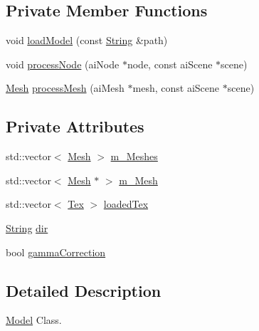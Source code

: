 \subsection*{Private Member Functions}
\begin{DoxyCompactItemize}
\item 
void \hyperlink{classspork_1_1graphics_1_1_model_a022a882076f86af30528a578058be5fa}{load\+Model} (const \hyperlink{my_string_8h_afbeda3fd1bdc8c37d01bdf9f5c8274ff}{String} \&path)
\item 
void \hyperlink{classspork_1_1graphics_1_1_model_a3396b1f9e42c2c2adbe3265b489f7729}{process\+Node} (ai\+Node $\ast$node, const ai\+Scene $\ast$scene)
\item 
\hyperlink{classspork_1_1graphics_1_1_mesh}{Mesh} \hyperlink{classspork_1_1graphics_1_1_model_a6949747e22cc53f7e11a46d01a54c385}{process\+Mesh} (ai\+Mesh $\ast$mesh, const ai\+Scene $\ast$scene)
\end{DoxyCompactItemize}
\subsection*{Private Attributes}
\begin{DoxyCompactItemize}
\item 
std\+::vector$<$ \hyperlink{classspork_1_1graphics_1_1_mesh}{Mesh} $>$ \hyperlink{classspork_1_1graphics_1_1_model_a2c88c2a99a6d609f1852bf103ec6e656}{m\+\_\+\+Meshes}
\item 
std\+::vector$<$ \hyperlink{classspork_1_1graphics_1_1_mesh}{Mesh} $\ast$ $>$ \hyperlink{classspork_1_1graphics_1_1_model_a3ffb7b06b220ae11c4d831795096f05b}{m\+\_\+\+Mesh}
\item 
std\+::vector$<$ \hyperlink{structspork_1_1graphics_1_1_tex}{Tex} $>$ \hyperlink{classspork_1_1graphics_1_1_model_a265f07af8885ad11afae2839dde5256d}{loaded\+Tex}
\item 
\hyperlink{my_string_8h_afbeda3fd1bdc8c37d01bdf9f5c8274ff}{String} \hyperlink{classspork_1_1graphics_1_1_model_ac566be33bfd7cfc1819c6de833f8cdc8}{dir}
\item 
bool \hyperlink{classspork_1_1graphics_1_1_model_a2c6c4c904b268e696f4998b47e883821}{gamma\+Correction}
\end{DoxyCompactItemize}


\subsection{Detailed Description}
\hyperlink{classspork_1_1graphics_1_1_model}{Model} Class. 

